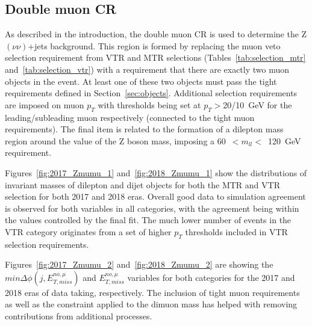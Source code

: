 \subsection{Double muon CR}
\hspace{10pt} As described in the introduction, the double muon CR is used to determine the Z$(\nu\nu)$+jets background. This region is formed by replacing the muon veto selection requirement from VTR and MTR selections (Tables~\ref{tab:selection_mtr} and~\ref{tab:selection_vtr}) with a requirement that there are exactly two muon objects in the event. At least one of these two objects must pass the tight requirements defined in Section~\ref{sec:objects}. Additional selection requirements are imposed on muon $p_T$ with thresholds being set at $p_T>$20/10~GeV for the leading/subleading muon respectively (connected to the tight muon requirements). The final item is related to the formation of a dilepton mass region around the value of the Z boson mass, imposing a 60~$<m_{ll}<$~120~GeV requirement.

\hspace{10pt} Figures~\ref{fig:2017_Zmumu_1} and~\ref{fig:2018_Zmumu_1} show the distributions of invariant masses of dilepton and dijet objects for both the MTR and VTR selection for both 2017 and 2018 eras. Overall good data to simulation agreement is observed for both variables in all categories, with the agreement being within the values controlled by the final fit. The much lower number of events in the VTR category originates from a set of higher $p_T$ thresholds included in VTR selection requirements.

\hspace{10pt} Figures~\ref{fig:2017_Zmumu_2} and~\ref{fig:2018_Zmumu_2} are showing the $min\Delta\phi(j, E_{T,miss}^{no,\mu})$ and $E_{T,miss}^{no,\mu}$ variables for both categories for the 2017 and 2018 eras of data taking, respectively. The inclusion of tight muon requirements as well as the constraint applied to the dimuon mass has helped with removing contributions from additional processes.

